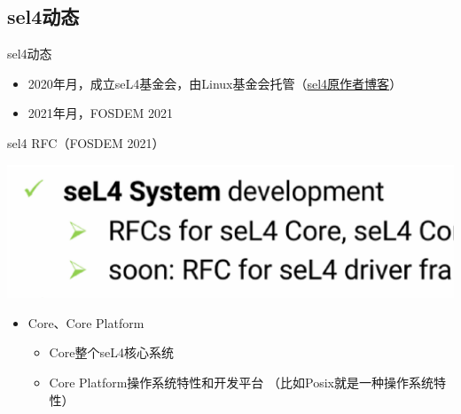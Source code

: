 \documentclass[presentation,dvipdfmx,CJKbookmarks]{beamer}
\begin{document}
\begin{CJK*}{UTF8}{simsun}
\section{sel4\thinspace 动态}
\label{sec:org4e0d6df}
\begin{frame}[label={sec:orge4a78ce}]{sel4\thinspace 动态}
\begin{itemize}
\item 2020\thinspace 年\thinspace 月，成立\thinspace seL4\thinspace 基金会，由\thinspace Linux\thinspace 基金会托管（\href{https://microkerneldude.wordpress.com/2020/04/07/the-sel4-foundation-what-and-why/}{sel4\thinspace 原作者博客}）
\item 2021\thinspace 年\thinspace 月，FOSDEM 2021
\end{itemize}
\end{frame}
\begin{frame}[label={sec:org32b56c5}]{sel4 RFC（FOSDEM 2021）}
\begin{center}
\includegraphics[width=.9\linewidth]{./images/rfc-for-core.ps}
\end{center}
\begin{itemize}
\item Core、Core Platform
\begin{itemize}
\item Core\thinspace 整个\thinspace seL4\thinspace 核心系统
\item Core Platform\thinspace 操作系统特性和开发平台
（比如\thinspace Posix\thinspace 就是一种操作系统特性）
\end{itemize}
\end{itemize}
\end{frame}


\end{CJK*}
\end{document}
